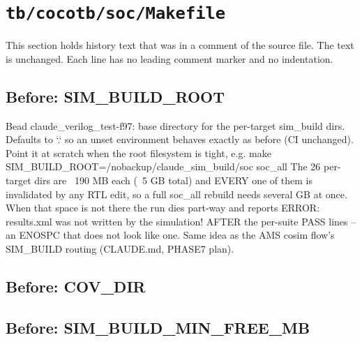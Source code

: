\section{\texttt{tb/cocotb/soc/Makefile}}\label{cr:suite:soc-makefile}

This section holds history text that was in a comment of the source file. The text is unchanged. Each line has no leading comment marker and no indentation.

\begin{record}

\subsection*{Before: SIM\_BUILD\_ROOT}

\begin{textblock}
Bead claude_verilog_test-f97: base directory for the per-target sim_build dirs.
Defaults to `.` so an unset environment behaves exactly as before (CI unchanged).
Point it at scratch when the root filesystem is tight, e.g.
  make SIM_BUILD_ROOT=/nobackup/claude_sim_build/soc soc_all
The 26 per-target dirs are ~190 MB each (~5 GB total) and EVERY one of them is
invalidated by any RTL edit, so a full soc_all rebuild needs several GB at once.
When that space is not there the run dies part-way and reports
  ERROR: results.xml was not written by the simulation!
AFTER the per-suite PASS lines -- an ENOSPC that does not look like one.
Same idea as the AMS cosim flow's SIM_BUILD routing (CLAUDE.md, PHASE7 plan).
\end{textblock}

\subsection*{Before: COV\_DIR}


\subsection*{Before: SIM\_BUILD\_MIN\_FREE\_MB}


\end{record}
